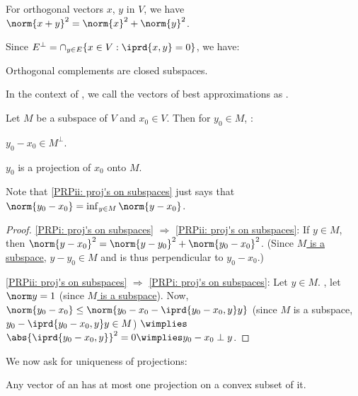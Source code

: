 	\begin{lem}[Pythagoras]
		For orthogonal vectors $x$, $y$ in $V$, we have $\norm{x + y}^2 = \norm{x}^2 + \norm{y}^2$.
	\end{lem}
	
	Since $E^\perp = \cap_{y\in E}\{x\in V : \iprd{x, y} = 0\}$, we have:
	
	\begin{lem}
		Orthogonal complements are closed subspaces.
	\end{lem}
	
	In the context of , we call the vectors of best approximations as .
	
	\begin{prp}\label{PRP: proj's on subspaces}
		Let $M$ be a subspace of $V$ and $x_0\in V$. Then for $y_0\in M$, \tfae:
		\begin{mylist}
			\item\label{PRPi: proj's on subspaces} $y_0 - x_0\in M^\perp$.
			\item\label{PRPii: proj's on subspaces} $y_0$ is a projection of $x_0$ onto $M$.
		\end{mylist}
	\end{prp}
	
	Note that \ref{PRPii: proj's on subspaces} just says that $\norm{y_0 - x_0} = \inf_{y\in M} \norm{y - x_0}$.
	
	\begin{proof}
		\ref{PRPi: proj's on subspaces} $\Rightarrow$ \ref{PRPii: proj's on subspaces}: If $y\in M$, then $\norm{y - x_0}^2 = \norm{y - y_0}^2 + \norm{y_0 - x_0}^2$. (Since \uline{$M$ is a subspace}, $y - y_0\in M$ and is thus perpendicular to $y_0 - x_0$.)
		
		\ref{PRPii: proj's on subspaces} $\Rightarrow$ \ref{PRPi: proj's on subspaces}: Let $y\in M$. \Wlogg, let $\norm y = 1$ (since \uline{$M$ is a subspace}). Now, $\norm{y_0 - x_0}\le \norm{y_0 - x_0 - \iprd{y_0 - x_0, y} y}$ (since $M$ is a subspace, $y_0 - \iprd{y_0 - x_0, y} y\in M$) $\wimplies$ $\abs{\iprd{y_0 - x_0, y}}^2 = 0\wimplies y_0 - x_0\perp y$.
	\end{proof}
	
	We now ask for uniqueness of projections:
	
	\begin{prp}
		Any vector of an \IPS has at most one projection on a convex subset of it.
	\end{prp}
	
